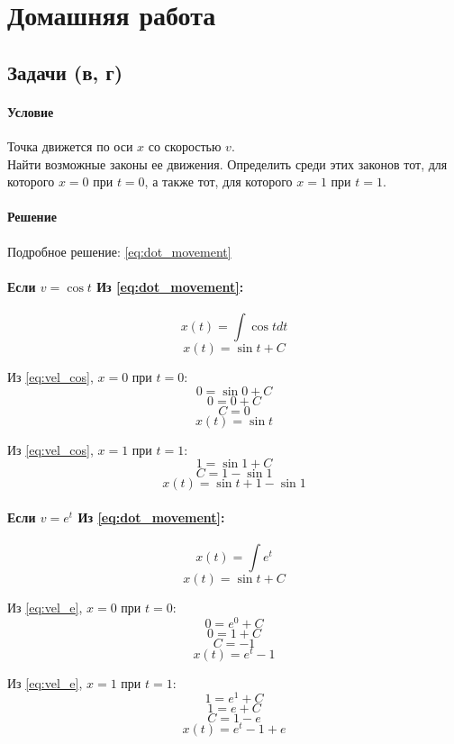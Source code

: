 \section{Домашняя работа}

\subsection{Задачи  (в, г)}
\paragraph{Условие}
Точка движется по оси $x$ со скоростью $v$.\\
Найти возможные законы ее движения. Определить среди этих законов тот, для которого $x = 0$ при $t = 0$, а также тот, для которого $x = 1$ при $t = 1$. 
\paragraph{Решение}
Подробное решение: \ref{eq:dot_movement}
\paragraph{Если $v = \cos t$ Из \ref{eq:dot_movement}:}
\[x(t) = \int\cos t dt\]
\begin{equation}
  x(t) = \sin t + C
  \label{eq:vel_cos}
\end{equation}

Из \ref{eq:vel_cos}, $x = 0$ при $t = 0$:
\[0 = \sin 0 + C\]
\[0 = 0 + C\]
\[C = 0\]
\[x(t) = \sin t\]

Из \ref{eq:vel_cos}, $x = 1$ при $t = 1$:
\[1 = \sin 1 + C\]
\[C = 1 - \sin 1\]
\[x(t) = \sin t + 1 - \sin 1\]

\paragraph{Если $v = e^t$ Из \ref{eq:dot_movement}:}
\[x(t) = \int e^t\]
\begin{equation}
  x(t) = \sin t + C
  \label{eq:vel_e}
\end{equation}

Из \ref{eq:vel_e}, $x = 0$ при $t = 0$:
\[0 = e^0 + C\]
\[0 = 1 + C\]
\[C = -1\]
\[x(t) = e^t - 1\]

Из \ref{eq:vel_e}, $x = 1$ при $t = 1$:
\[1 = e^1 + C\]
\[1 = e + C\]
\[C = 1 - e\]
\[x(t) = e^t - 1 + e\]

